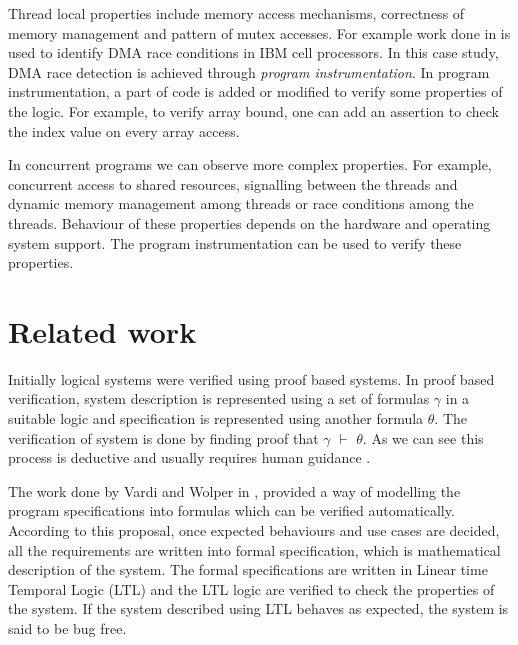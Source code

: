Thread local properties include memory access mechanisms, correctness of memory management and pattern of mutex accesses. For example work done in \cite{Donaldson:2011:AAD:2034876.2034900} is used to identify DMA race conditions in IBM cell processors. In this case study, DMA race detection is achieved through \emph{program instrumentation}. In program instrumentation, a part of code is added or modified to verify some properties of the logic. For example, to verify array bound, one can add an assertion to check the index value on every array access.

In concurrent programs we can observe more complex properties. For example, concurrent access to shared resources, signalling between the threads and dynamic memory management among threads or race conditions among the threads. Behaviour of these properties depends on the hardware and operating system support. The program instrumentation can be used to verify these properties.



\chapter{Related work}\label{sec:verification:tech}

Initially logical systems were verified using proof based systems. In proof based verification, system description is represented using a set of formulas $\gamma$ in a suitable logic and specification is represented using another formula $\theta$. The verification of system is done by finding proof that $\gamma$ $\vdash$ $\theta$. As we can see this process is deductive and usually requires human guidance \cite{Hoare04communicatingsequential, Apt:1981:TYH:357146.357150}.


The work done by Vardi and Wolper in \cite{VardiW86}, provided a way of modelling the program specifications into formulas which can be verified automatically. According to this proposal, once expected behaviours and use cases are decided, all the requirements are written into formal specification, which is mathematical description of the system. The formal specifications are written in Linear time Temporal Logic (LTL) and the LTL logic are verified to check the properties of the system. If the system described using LTL behaves as expected, the system is said to be bug free.

